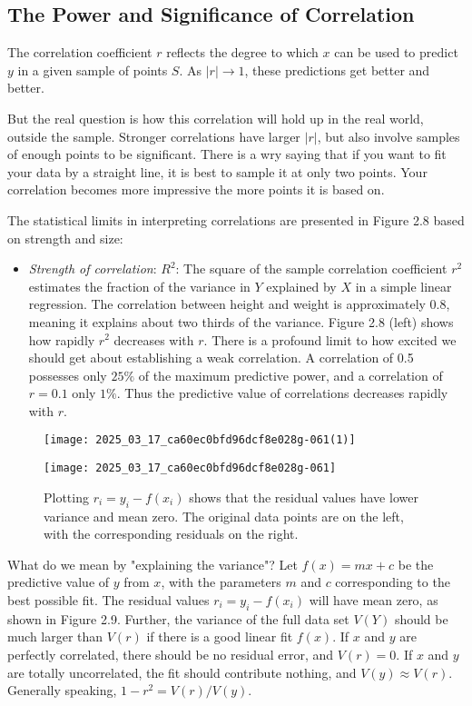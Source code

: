 \documentclass[10pt]{article}
\begin{document}
\subsection{The Power and Significance of Correlation}
The correlation coefficient $r$ reflects the degree to which $x$ can be used to predict $y$ in a given sample of points $S$. As $|r| \rightarrow 1$, these predictions get better and better.

But the real question is how this correlation will hold up in the real world, outside the sample. Stronger correlations have larger $|r|$, but also involve samples of enough points to be significant. There is a wry saying that if you want to fit your data by a straight line, it is best to sample it at only two points. Your correlation becomes more impressive the more points it is based on.

The statistical limits in interpreting correlations are presented in Figure 2.8 based on strength and size:

\begin{itemize}
  \item \textit{Strength of correlation}: $R^{2}$: The square of the sample correlation coefficient $r^{2}$ estimates the fraction of the variance in $Y$ explained by $X$ in a simple linear regression. The correlation between height and weight is approximately 0.8, meaning it explains about two thirds of the variance. Figure 2.8 (left) shows how rapidly $r^{2}$ decreases with $r$. There is a profound limit to how excited we should get about establishing a weak correlation. A correlation of 0.5 possesses only $25\%$ of the maximum predictive power, and a correlation of $r=0.1$ only $1\%$. Thus the predictive value of correlations decreases rapidly with $r$.
\end{itemize}

\begin{figure}[ht]
\centering
\texttt{[image: 2025\_03\_17\_ca60ec0bfd96dcf8e028g-061(1)]}

\texttt{[image: 2025\_03\_17\_ca60ec0bfd96dcf8e028g-061]}
\caption{Plotting $r_{i}=y_{i}-f\left(x_{i}\right)$ shows that the residual values have lower variance and mean zero. The original data points are on the left, with the corresponding residuals on the right.}
\end{figure}

What do we mean by "explaining the variance"? Let $f(x)=m x+c$ be the predictive value of $y$ from $x$, with the parameters $m$ and $c$ corresponding to the best possible fit. The residual values $r_{i}=y_{i}-f\left(x_{i}\right)$ will have mean zero, as shown in Figure 2.9. Further, the variance of the full data set $V(Y)$ should be much larger than $V(r)$ if there is a good linear fit $f(x)$. If $x$ and $y$ are perfectly correlated, there should be no residual error, and $V(r)=0$. If $x$ and $y$ are totally uncorrelated, the fit should contribute nothing, and $V(y) \approx V(r)$. Generally speaking, $1-r^{2}=V(r) / V(y)$.
\end{document}
